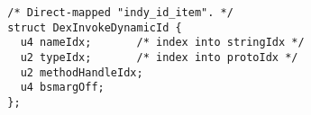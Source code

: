 {\scriptsize \begin{verbatim}
  /* Direct-mapped "indy_id_item". */
  struct DexInvokeDynamicId {
    u4 nameIdx;       /* index into stringIdx */
    u2 typeIdx;       /* index into protoIdx */
    u2 methodHandleIdx;
    u4 bsmargOff;
  };
\end{verbatim} }
